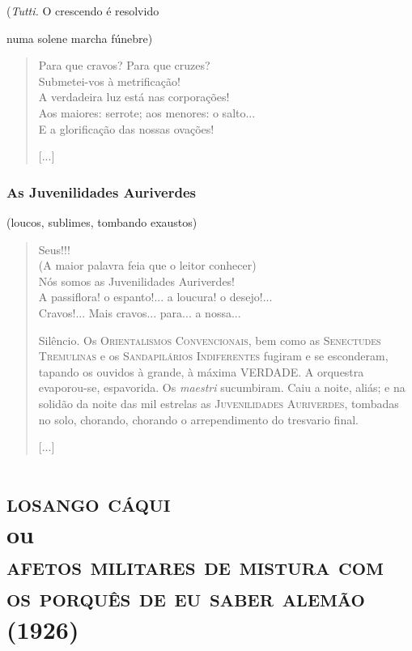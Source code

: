\hfill{}(\emph{Tutti.} O crescendo é resolvido

\hfill{}numa solene marcha fúnebre)

\begin{verse}
Para que cravos? Para que cruzes?\\
Submetei-vos à metrificação!\\
A verdadeira luz está nas corporações!\\
Aos maiores: serrote; aos menores: o salto...\\
E a glorificação das nossas ovações!

{[}...{]}
\end{verse}

\section{As Juvenilidades Auriverdes}

\hfill{}(loucos, sublimes, tombando exaustos)

\begin{verse}
Seus\dotfill{}!!!\\
(A maior palavra feia que o leitor conhecer)\\
Nós somos as Juvenilidades Auriverdes!\\
A passiflora! o espanto!... a loucura! o desejo!...\\
Cravos!... Mais cravos... para... a nossa...

Silêncio. Os \textsc{Orientalismos Convencionais}, bem como as
\textsc{Senectudes Tremulinas} e os \textsc{Sandapilários Indiferentes}
fugiram e se esconderam, tapando os ouvidos à grande, à máxima VERDADE.
A orquestra evaporou-se, espavorida. Os \emph{maestri} sucumbiram. Caiu
a noite, aliás; e na solidão da noite das mil estrelas as
\textsc{Juvenilidades Auriverdes}, tombadas no solo, chorando, chorando
o arrependimento do tresvario final.

{[}...{]}
\end{verse}

\part[Losango cáqui]{\textsc{losango cáqui}\\ou\\\textsc{afetos militares de mistura com os porquês de eu saber alemão}\\(1926)}
\removeepigraph

